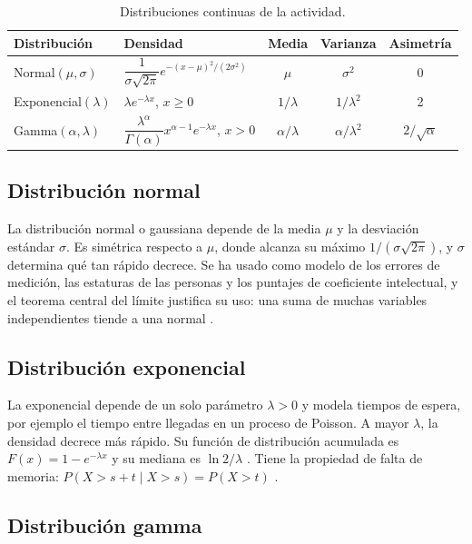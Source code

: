 \documentclass[11pt,letterpaper]{article}
\begin{document}
\begin{table}[htbp]
\centering
\caption{Distribuciones continuas de la actividad.}
\label{tab:resumen}
\small
\renewcommand{\arraystretch}{1.6}
\begin{tabular}{llccc}
\hline
\textbf{Distribución} & \textbf{Densidad} & \textbf{Media} & \textbf{Varianza} & \textbf{Asimetría} \\
\hline
Normal$(\mu, \sigma)$ & $\dfrac{1}{\sigma\sqrt{2\pi}}e^{-(x-\mu)^2/(2\sigma^2)}$ & $\mu$ & $\sigma^2$ & 0 \\
Exponencial$(\lambda)$ & $\lambda e^{-\lambda x}$, \; $x \ge 0$ & $1/\lambda$ & $1/\lambda^2$ & 2 \\
Gamma$(\alpha, \lambda)$ & $\dfrac{\lambda^\alpha}{\Gamma(\alpha)}x^{\alpha-1}e^{-\lambda x}$, \; $x > 0$ & $\alpha/\lambda$ & $\alpha/\lambda^2$ & $2/\sqrt{\alpha}$ \\
\hline
\end{tabular}
\end{table}

\subsection{Distribución normal}

La distribución normal o gaussiana depende de la media $\mu$ y la desviación estándar $\sigma$. Es simétrica respecto a $\mu$, donde alcanza su máximo $1/(\sigma\sqrt{2\pi})$, y $\sigma$ determina qué tan rápido decrece. Se ha usado como modelo de los errores de medición, las estaturas de las personas y los puntajes de coeficiente intelectual, y el teorema central del límite justifica su uso: una suma de muchas variables independientes tiende a una normal \parencite{tecnm2026_documento_fuente,bonamente2017}.

\subsection{Distribución exponencial}

La exponencial depende de un solo parámetro $\lambda > 0$ y modela tiempos de espera, por ejemplo el tiempo entre llegadas en un proceso de Poisson. A mayor $\lambda$, la densidad decrece más rápido. Su función de distribución acumulada es $F(x) = 1 - e^{-\lambda x}$ y su mediana es $\ln 2/\lambda$ \parencite{tecnm2026_documento_fuente}. Tiene la propiedad de falta de memoria: $P(X > s + t \mid X > s) = P(X > t)$ \parencite{rice2006}.

\subsection{Distribución gamma}
\end{document}
